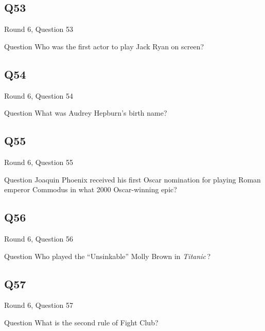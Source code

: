 \documentclass[11pt]{beamer}
\begin{document}
\subsection*{Q53}
\begin{frame}[t]{Round 6, Question 53}
\vspace{2em}
\begin{block}{Question}
Who was the first actor to play Jack Ryan on screen?
\end{block}
\end{frame}
    

\subsection*{Q54}
\begin{frame}[t]{Round 6, Question 54}
\vspace{2em}
\begin{block}{Question}
What was Audrey Hepburn's birth name?
\end{block}
\end{frame}
    

\subsection*{Q55}
\begin{frame}[t]{Round 6, Question 55}
\vspace{2em}
\begin{block}{Question}
Joaquin Phoenix received his first Oscar nomination for playing Roman emperor Commodus in what 2000 Oscar-winning epic?
\end{block}
\end{frame}
    

\subsection*{Q56}
\begin{frame}[t]{Round 6, Question 56}
\vspace{2em}
\begin{block}{Question}
Who played the ``Unsinkable'' Molly Brown in \emph{Titanic}\,?
\end{block}
\end{frame}
    

\subsection*{Q57}
\begin{frame}[t]{Round 6, Question 57}
\vspace{2em}
\begin{block}{Question}
What is the second rule of Fight Club?
\end{block}
\end{frame}
    
\end{document}
